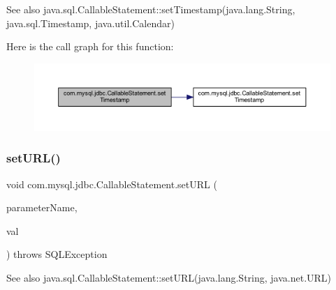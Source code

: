 \begin{DoxySeeAlso}{See also}
java.\+sql.\+Callable\+Statement\+::set\+Timestamp(java.\+lang.\+String, java.\+sql.\+Timestamp, java.\+util.\+Calendar) 
\end{DoxySeeAlso}
Here is the call graph for this function\+:\nopagebreak
\begin{figure}[H]
\begin{center}
\leavevmode
\includegraphics[width=350pt]{classcom_1_1mysql_1_1jdbc_1_1_callable_statement_a42215831c39b5cfa589e7e2906f1de17_cgraph}
\end{center}
\end{figure}
\mbox{\label{classcom_1_1mysql_1_1jdbc_1_1_callable_statement_ad04fcf69ca66624f4c2dd44fcee0d8cc}} 
\subsubsection{\texorpdfstring{set\+U\+R\+L()}{setURL()}}
{\footnotesize\ttfamily void com.\+mysql.\+jdbc.\+Callable\+Statement.\+set\+U\+RL (\begin{DoxyParamCaption}\item[{String}]{parameter\+Name,  }\item[{U\+RL}]{val }\end{DoxyParamCaption}) throws S\+Q\+L\+Exception}

\begin{DoxySeeAlso}{See also}
java.\+sql.\+Callable\+Statement\+::set\+U\+RL(java.\+lang.\+String, java.\+net.\+U\+RL) 
\end{DoxySeeAlso}
\mbox{\label{classcom_1_1mysql_1_1jdbc_1_1_callable_statement_affe08c14046e4beec81956a7dc445dc3}} 
